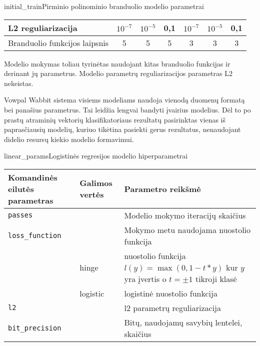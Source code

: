 \begin{ktutable}{initial_train}{Pirminio polinominio branduolio modelio parametrai}
    \begin{tabular}{| l | c | c | c | c | c | c | }
    \hline
        L2 reguliarizacija & $10^{-7}$ & $10^{-5}$ & 0,1 & $10^{-7}$ & $10^{-5}$ & 0,1 \\ \hline
        Branduolio funkcijos laipsnis & 5 & 5 & 5 & 3 & 3 & 3 \\ \hline
    \end{tabular}
\end{ktutable}

Modelio mokymas toliau tyrinėtas naudojant kitas branduolio funkcijas ir derinant jų parametrus.
Modelio parametrų reguliarizacijos parametras L2 nekeistas.



Vowpal Wabbit sistema visiems modeliams naudoja vienodą duomenų formatą bei panašius parametrus.
Tai leidžia lengvai bandyti įvairius modelius. Dėl to po prastų atraminių vektorių klasifikatoriaus rezultatų
pasirinktas vienas iš paprasčiausių modelių, kuriuo tikėtina pasiekti gerus rezultatus, nenaudojant
didelio resursų kiekio modelio formavimui.

\begin{ktutable}{linear_params}{Logistinės regresijos modelio hiperparametrai}
    \begin{tabular}{| l | l | p{7cm}|}
    \hline
        Komandinės eilutės parametras & Galimos vertės & Parametro reikšmė\\ \hline
        \texttt{passes} &  & Modelio mokymo iteracijų skaičius \\ \hline
        \texttt{loss\_function} &          & Mokymo metu naudojama nuostolio funkcija \\
                               & hinge    & nuostolio funkcija $l(y) = \max(0, 1 - t * y)$ kur $y$ yra įvertis o $t = \pm 1$ tikroji klasė  \\
                               & logistic & logistinė nuostolio funkcija \\ \hline
        \texttt{l2} & & l2 parametrų reguliarizacija \\ \hline
        \texttt{bit\_precision} & & Bitų, naudojamų savybių lentelei, skaičius\\ \hline
    \end{tabular}
\end{ktutable}

